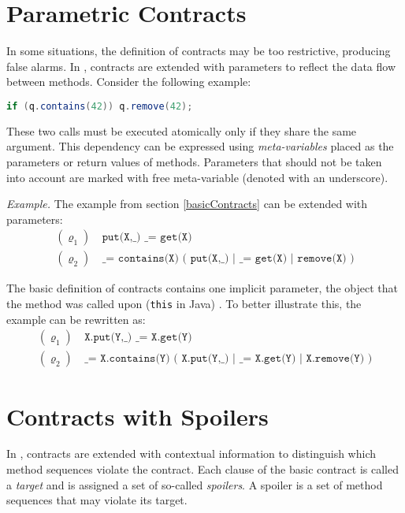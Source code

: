 \section{Parametric Contracts}
\label{parametricContracts}

In some situations, the definition of contracts may be too restrictive,
producing false alarms. In \cite{contracts}, contracts are extended with
parameters to reflect the data flow between methods. Consider the following
example:
\begin{lstlisting}[language=java]
if (q.contains(42)) q.remove(42);
\end{lstlisting}

These two calls must be executed atomically only if they share the same
argument. This dependency can be expressed using \emph{meta-variables} placed as
the parameters or return values of methods. Parameters that should not be taken
into account are marked with free meta-variable (denoted with an underscore).

\emph{Example.} The example from section \ref{basicContracts} can be extended
with parameters:
\begin{align*}
    (\varrho_1) &\ \texttt{put(X,\_) \_ = get(X)}\\
    (\varrho_2) &\ \texttt{\_ = contains(X) ( put(X,\_) | \_ = get(X) |
    remove(X) )}
\end{align*}

The basic definition of contracts contains one implicit parameter, the object
that the method was called upon (\texttt{this} in Java) \cite{FITPUB10817}. To
better illustrate this, the example can be rewritten as:
\begin{align*}
    (\varrho_1) &\ \texttt{X.put(Y,\_) \_ = X.get(Y)}\\
    (\varrho_2) &\ \texttt{\_ = X.contains(Y) ( X.put(Y,\_) | \_ = X.get(Y) |
    X.remove(Y) )}
\end{align*}


\section{Contracts with Spoilers}
\label{contractsWithSpoilers}

In \cite{contracts}, contracts are extended with contextual information to
distinguish which method sequences violate the contract. Each clause of the
basic contract is called a \emph{target} and is assigned a set of so-called
\emph{spoilers}. A spoiler is a set of method sequences that may violate its
target.


